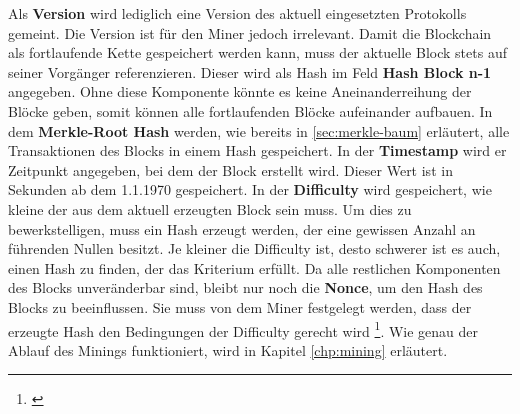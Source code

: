 Als \textbf{Version} wird lediglich eine Version des aktuell eingesetzten Protokolls gemeint. Die Version ist für den Miner jedoch irrelevant.
Damit die Blockchain als fortlaufende Kette gespeichert werden kann, muss der aktuelle Block stets auf seiner Vorgänger referenzieren. Dieser wird als Hash im Feld \textbf{Hash Block n-1} angegeben. Ohne diese Komponente könnte es keine Aneinanderreihung der Blöcke geben, somit können alle fortlaufenden Blöcke aufeinander aufbauen.
In dem \textbf{Merkle-Root Hash} werden, wie bereits in \cref{sec:merkle-baum} erläutert, alle Transaktionen des Blocks in einem Hash gespeichert. In der \textbf{Timestamp} wird er Zeitpunkt angegeben, bei dem der Block erstellt wird. Dieser Wert ist in Sekunden ab dem 1.1.1970 gespeichert.
In der \textbf{Difficulty} wird gespeichert, wie kleine der aus dem aktuell erzeugten Block sein muss. Um dies zu bewerkstelligen, muss ein Hash erzeugt werden, der eine gewissen Anzahl an führenden Nullen besitzt. Je kleiner die Difficulty ist, desto schwerer ist es auch, einen Hash zu finden, der das Kriterium erfüllt. 
Da alle restlichen Komponenten des Blocks unveränderbar sind, bleibt nur noch die \textbf{Nonce}, um den Hash des Blocks zu beeinflussen. Sie muss von dem Miner festgelegt werden, dass der erzeugte Hash den Bedingungen der Difficulty gerecht wird \footnote{\parencite[vgl.][]{Vidrih.29.12.2018}}. Wie genau der Ablauf des Minings funktioniert, wird in Kapitel \cref{chp:mining} erläutert.

